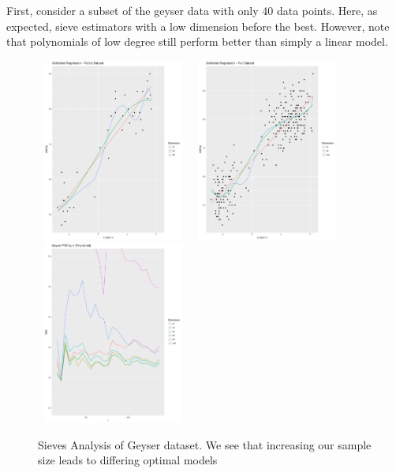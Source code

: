 \documentclass[12pt]{article}  %
\begin{document}
First, consider a subset of the geyser data with only 40 data points.  Here, as expected, sieve estimators with a low dimension before the best. However, note that polynomials of low degree still perform better than simply a linear model.
\begin{figure}[h]
    \centering
    \includegraphics[width=0.45\textwidth, height = 6cm]{Geyser_Small_Data.pdf}
    \includegraphics[width=0.45\textwidth, height = 6cm]{Geyser_Full.pdf}\\
    \includegraphics[width=0.45\textwidth, height = 6cm]{Geyser_PSE.pdf}\\
    \caption{Sieves Analysis of Geyser dataset. We see that increasing our sample size leads to differing optimal models}
    \label{fig:Geyser}{}
\end{figure}
\end{document}
